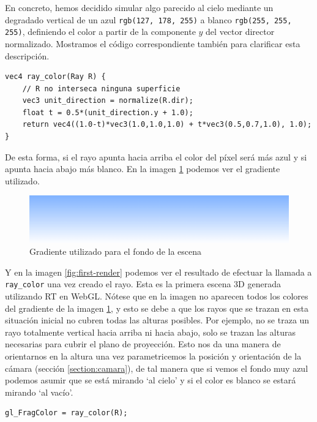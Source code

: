 En concreto, hemos decidido simular algo parecido al cielo mediante un degradado vertical de un \textcolor{background-blue}{azul} \texttt{rgb(127, 178, 255)} a blanco \texttt{rgb(255, 255, 255)}, definiendo el color a partir de la componente $y$ del vector director normalizado. Mostramos el código correspondiente también para clarificar esta descripción.

\begin{lstlisting}
vec4 ray_color(Ray R) {
    // R no interseca ninguna superficie
    vec3 unit_direction = normalize(R.dir);
    float t = 0.5*(unit_direction.y + 1.0);
    return vec4((1.0-t)*vec3(1.0,1.0,1.0) + t*vec3(0.5,0.7,1.0), 1.0);
}
\end{lstlisting}

De esta forma, si el rayo apunta hacia arriba el color del píxel será más azul y si apunta hacia abajo más blanco. En la imagen \ref{fig:background} podemos ver el gradiente utilizado.

\begin{figure} [ht]
    \centering
    \includegraphics[scale = 0.35]{img/C8/background-gradient.png}
    \caption{Gradiente utilizado para el fondo de la escena}
    \label{fig:background}
\end{figure}

Y en la imagen \ref{fig:first-render} podemos ver el resultado de efectuar la llamada a \verb|ray_color| una vez creado el rayo. Esta es la primera escena 3D generada utilizando RT en WebGL. Nótese que en la imagen no aparecen todos los colores del gradiente de la imagen \ref{fig:background}, y esto se debe a que los rayos que se trazan en esta situación inicial no cubren todas las alturas posibles. Por ejemplo, no se traza un rayo totalmente vertical hacia arriba ni hacia abajo, solo se trazan las alturas necesarias para cubrir el plano de proyección. Esto nos da una manera de orientarnos en la altura una vez parametricemos la posición y orientación de la cámara (sección \ref{section:camara}), de tal manera que si vemos el fondo muy azul podemos asumir que se está mirando `al cielo' y si el color es blanco se estará mirando `al vacío'. 

\begin{lstlisting}
gl_FragColor = ray_color(R);
\end{lstlisting}


